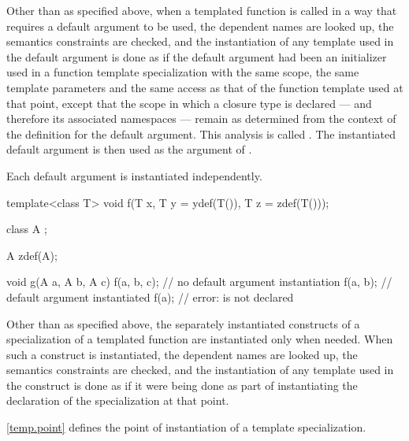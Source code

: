 \pnum
Other than as specified above,
when a templated function
is called in a way that requires a default argument to be used,
the dependent names are looked up, the semantics constraints are checked,
and the instantiation of any template used in the default argument
is done as if the default argument had been
an initializer used in a function template specialization with the same scope,
the same template parameters and the same access as that of the function template
used at that point, except that the scope in which a closure type is
declared --- and therefore its associated namespaces ---
remain as determined from the context of the definition for the default
argument.
This analysis is called
.
The instantiated default argument is then used as the argument of
.

\pnum
\begin{note}
Each default argument is instantiated independently.
\end{note}
\begin{example}
\begin{codeblock}
template<class T> void f(T x, T y = ydef(T()), T z = zdef(T()));

class  A { };

A zdef(A);

void g(A a, A b, A c) {
  f(a, b, c);       // no default argument instantiation
  f(a, b);          // default argument  instantiated
  f(a);             // error:  is not declared
}
\end{codeblock}
\end{example}

\pnum
Other than as specified above,
the separately instantiated constructs
of a specialization of a templated function
are instantiated only when needed.
When such a construct is instantiated,
the dependent names are looked up,
the semantics constraints are checked, and
the instantiation of any template used in the construct
is done as if it were being done as part of instantiating the declaration
of the specialization at that point.

\pnum
\begin{note}
\ref{temp.point} defines the point of instantiation of a template specialization.
\end{note}

